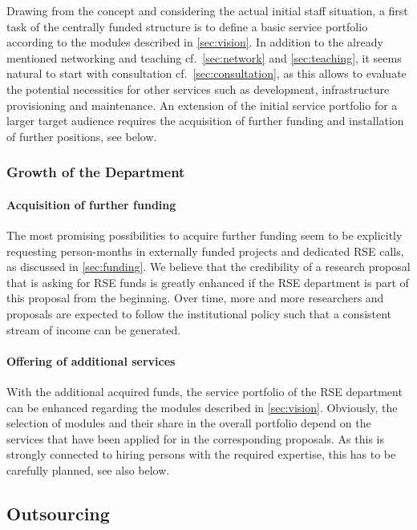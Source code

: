 \documentclass[a4paper]{article}
\begin{document}
Drawing from the concept and considering the actual initial staff situation, a first task of the centrally funded structure is to define a basic service portfolio according to the modules described in \autoref{sec:vision}.
In addition to the already mentioned networking and teaching cf.~\autoref{sec:network} and \autoref{sec:teaching}, it seems natural to start with consultation cf.~\autoref{sec:consultation},
as this allows to evaluate the potential necessities for other services such as development, infrastructure provisioning and maintenance.
An extension of the initial service portfolio for a larger target audience requires the acquisition of further funding and installation of further positions, see below.

\subsubsection{Growth of the Department}

\paragraph{Acquisition of further funding}
The most promising possibilities to acquire further funding seem to be explicitly requesting person-months in externally funded projects and dedicated RSE calls, as discussed in \autoref{sec:funding}.
We believe that the credibility of a research proposal that is asking for RSE funds is greatly enhanced if the RSE department is part of this proposal from the beginning.
Over time, more and more researchers and proposals are expected to follow the institutional policy such that a consistent stream of income can be generated.

\paragraph{Offering of additional services}
With the additional acquired funds, the service portfolio of the RSE department can be enhanced regarding the modules described in \autoref{sec:vision}.
Obviously, the selection of modules and their share in the overall portfolio depend on the services that have been applied for in the corresponding proposals.
As this is strongly connected to hiring persons with the required expertise, this has to be carefully planned, see also below.


\subsection{Outsourcing}
\end{document}
